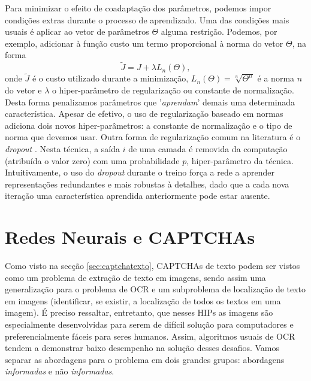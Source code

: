 Para minimizar o efeito de coadaptação dos parâmetros, podemos impor condições extras durante o processo de aprendizado. Uma das condições mais usuais é aplicar ao vetor de parâmetros $\Theta$ alguma restrição. Podemos, por exemplo, adicionar à função custo um termo proporcional à norma do vetor $\Theta$, na forma
\begin{equation}
\tilde{J} = J + \lambda L_n(\Theta),
\end{equation}
onde $\tilde{J}$ é o custo utilizado durante a minimização, $L_n(\Theta) = \sqrt[n]{\Theta^n}$ é a norma $n$ do vetor e $\lambda$ o hiper-parâmetro de regularização ou constante de normalização. Desta forma penalizamos parâmetros que '\textit{aprendam}' demais uma determinada característica. Apesar de efetivo, o uso de regularização baseado em normas adiciona dois novos hiper-parâmetros: a constante de normalização e o tipo de norma que devemos usar. Outra forma de regularização comum na literatura é o \textit{dropout} \cite{hinton2012improving}. Nesta técnica, a saída $i$ de uma camada é removida da computação (atribuída o valor zero) com uma probabilidade $p$, hiper-parâmetro da técnica. Intuitivamente, o uso do \textit{dropout} durante o treino força a rede a aprender representações redundantes e mais robustas à detalhes, dado que a cada nova iteração uma característica aprendida anteriormente pode estar ausente.

\section{Redes Neurais e CAPTCHAs}

Como visto na secção \ref{sec:captchatexto}, CAPTCHAs de texto podem ser vistos como um problema de extração de texto em imagens, sendo assim uma generalização para o problema de OCR e um subproblema de localização de texto em imagens (identificar, se existir, a localização de todos os textos em uma imagem). É preciso ressaltar, entretanto, que nesses HIPs as imagens são especialmente desenvolvidas para serem de difícil solução para computadores e preferencialmente fáceis para seres humanos. Assim, algoritmos usuais de OCR tendem a demonstrar baixo desempenho na solução desses desafios. Vamos separar as abordagens para o problema em dois grandes grupos: abordagens \textit{informadas} e não \textit{informadas}.

